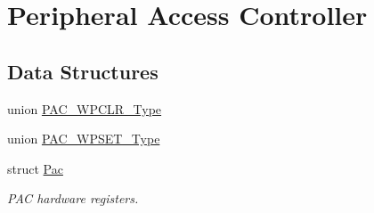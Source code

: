 \hypertarget{group___s_a_m_d21___p_a_c}{}\section{Peripheral Access Controller}
\label{group___s_a_m_d21___p_a_c}
\subsection*{Data Structures}
\begin{DoxyCompactItemize}
\item 
union \mbox{\hyperlink{union_p_a_c___w_p_c_l_r___type}{P\+A\+C\+\_\+\+W\+P\+C\+L\+R\+\_\+\+Type}}
\item 
union \mbox{\hyperlink{union_p_a_c___w_p_s_e_t___type}{P\+A\+C\+\_\+\+W\+P\+S\+E\+T\+\_\+\+Type}}
\item 
struct \mbox{\hyperlink{struct_pac}{Pac}}
\begin{DoxyCompactList}\small\item\em P\+AC hardware registers. \end{DoxyCompactList}\end{DoxyCompactItemize}
